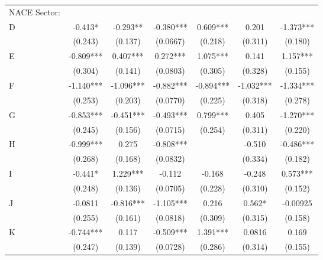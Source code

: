 \begin{threeparttable}
\begin{tabular}{l*{6}{S}}
NACE Sector:              \\[1ex]
\quad D                   &  -0.413*   & -0.293**  & -0.380***  & 0.609***  & 0.201      & -1.373***  \\
                          &  (0.243)   & (0.137)   & (0.0667)   & (0.218)   & (0.311)    & (0.180)    \\[0.5ex]

\quad E                   &  -0.809*** & 0.407***  & 0.272***   & 1.075***  & 0.141      & 1.157***   \\
                          &  (0.304)   & (0.141)   & (0.0803)   & (0.305)   & (0.328)    & (0.155)    \\[0.5ex]

\quad F                   &  -1.140*** & -1.096*** & -0.882***  & -0.894*** & -1.032***  & -1.334***  \\
                          &  (0.253)   & (0.203)   & (0.0770)   & (0.225)   & (0.318)    & (0.278)    \\[0.5ex]

\quad G                   &  -0.853*** & -0.451*** & -0.493***  & 0.799***  & 0.405      & -1.270***  \\
                          &  (0.245)   & (0.156)   & (0.0715)   & (0.254)   & (0.311)    & (0.220)    \\[0.5ex]

\quad H                   &  -0.999*** & 0.275     & -0.808***  &           & -0.510     & -0.486***  \\
                          &  (0.268)   & (0.168)   & (0.0832)   &           & (0.334)    & (0.182)    \\[0.5ex]

\quad I                   &  -0.441*   & 1.229***  & -0.112     & -0.168    & -0.248     & 0.573***   \\
                          &  (0.248)   & (0.136)   & (0.0705)   & (0.228)   & (0.310)    & (0.152)    \\[0.5ex]

\quad J                   &  -0.0811   & -0.816*** & -1.105***  & 0.216     & 0.562*     & -0.00925   \\
                          &  (0.255)   & (0.161)   & (0.0818)   & (0.309)   & (0.315)    & (0.158)    \\[0.5ex]

\quad K                   &  -0.744*** & 0.117     & -0.509***  & 1.391***  & 0.0816     & 0.169      \\
                          &  (0.247)   & (0.139)   & (0.0728)   & (0.286)   & (0.314)    & (0.155)    \\[0.5ex]


\end{tabular}
\end{threeparttable}

